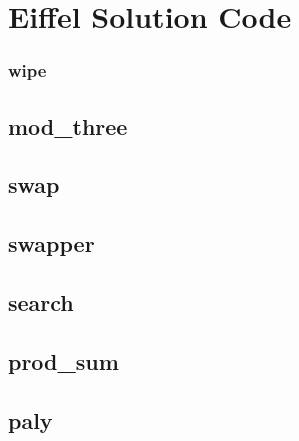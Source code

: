 \section{Eiffel Solution Code}\label{eiffel_code_solution}

\subsubsection{wipe}\label{eiffel_code_wipe_solution}

\pagebreak
\subsection{mod\_three}\label{eiffel_code_mod_three_solution}

\pagebreak
\subsection{swap}\label{eiffel_code_swap_solution}

\pagebreak
\subsection{swapper}\label{eiffel_code_swapper_solution}

\pagebreak
\subsection{search}\label{eiffel_code_search_solution}

\pagebreak
\subsection{prod\_sum}\label{eiffel_code_prod_sum_solution}

\pagebreak
\subsection{paly}\label{eiffel_code_paly_solution}

\pagebreak